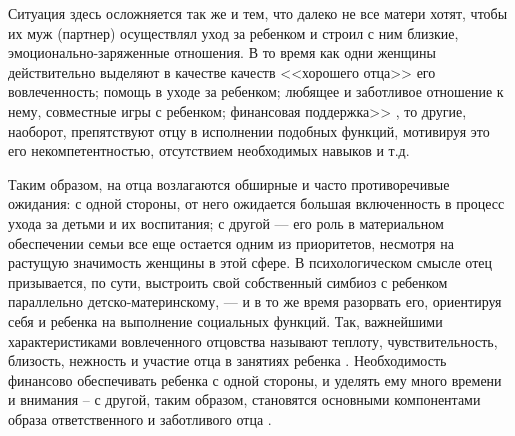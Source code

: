 \documentclass{../../common/thesisbyxetex}
\begin{document}
Ситуация здесь осложняется так же и тем, что далеко не все матери хотят, чтобы их муж (партнер)
осуществлял уход за ребенком и строил с ним близкие, эмоционально-заряженные отношения. В то время
как одни женщины действительно выделяют в качестве качеств <<хорошего отца>>  его вовлеченность;
помощь в уходе за ребенком; любящее и
заботливое отношение к нему, совместные игры с ребенком; финансовая поддержка>> \cite[137]{money},
то другие, наоборот, препятствуют отцу в исполнении подобных функций, мотивируя это его
некомпетентностью, отсутствием необходимых навыков и т.д.

Таким образом, на отца возлагаются обширные и часто противоречивые ожидания: с одной стороны, от
него ожидается большая включенность в процесс ухода за детьми и их воспитания; с другой --- его
роль в материальном обеспечении семьи все еще остается одним из приоритетов, несмотря на растущую
значимость женщины в этой сфере. В психологическом смысле отец призывается, по сути, выстроить свой
собственный симбиоз с ребенком параллельно детско-материнскому, --- и в то же время разорвать его,
ориентируя себя и ребенка на выполнение социальных функций. Так, важнейшими характеристиками
вовлеченного отцовства называют теплоту, чувствительность, близость, нежность и участие отца в
занятиях ребенка \cite[129]{f21}.
Необходимость финансово обеспечивать ребенка с одной стороны, и уделять ему много времени и
внимания -- с другой, таким образом, становятся основными компонентами образа ответственного и
заботливого отца \cite[129]{f21}.
\end{document}
